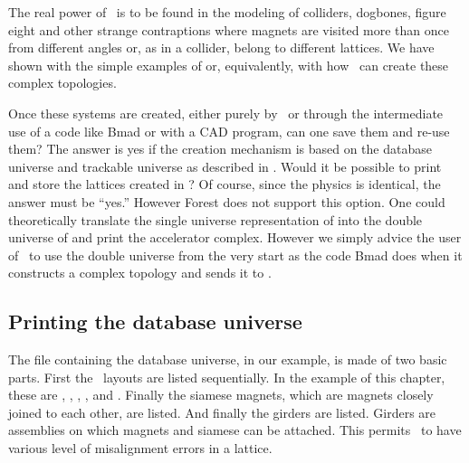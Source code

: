 The real power of \PTC\ is to be found in the modeling of colliders,
dogbones, figure eight and other strange contraptions where magnets
are visited more than once from different angles or, as in a collider,
belong to different lattices.  We have shown with the simple examples
of  or, equivalently, with
 how \PTC\ can create these complex
topologies.

Once these systems are created, either purely by \PTC\, or through the
intermediate use of a code like Bmad or with a CAD program, can one
save them and re-use them? The answer is yes if the creation mechanism
is based on the database universe  and trackable universe
 as described in . Would it be
possible to print and store the lattices created in
? Of course, since the physics is identical, the
answer must be ``yes.'' However Forest does not support this
option. One could theoretically translate the single universe
representation of  into the double universe of
 and print the accelerator complex. However
we simply advice the user of \PTC\ to use the double universe from the
very start as the code Bmad does when it constructs a complex topology
and sends it to \PTC .

\subsection{Printing the database universe}

The file containing the database universe,  in our
example, is made of two basic parts. First the \DNA\ layouts are
listed sequentially. In the example of this chapter, these are
, , , ,  and . Finally
the siamese magnets, which are magnets closely joined to each other,
are listed. And finally the girders are listed. Girders are assemblies
on which magnets and siamese can be attached. This permits \PTC\ to
have various level of misalignment errors in a lattice.
 
